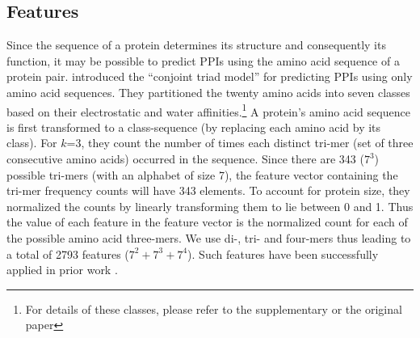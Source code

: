 \documentclass{bioinfo}
\begin{document}
\subsection{Features}
Since the sequence of a protein determines its structure and consequently its function, it may be possible to predict PPIs using the amino acid sequence of a protein pair. \cite{shen:2007} introduced the ``conjoint triad model'' for predicting PPIs using only amino acid sequences. They partitioned the twenty amino acids into seven classes based on their electrostatic and water affinities.\footnote{For details of these classes, please refer to the supplementary or the original paper}
A protein's amino acid sequence is first transformed to a class-sequence (by replacing each amino acid by its class).
For $k$=3, they count the number of times each distinct tri-mer (set of three consecutive amino acids) occurred in the sequence.
Since there are 343 ($7^3$) possible tri-mers (with an alphabet of size 7), the feature vector containing the tri-mer frequency counts will have 343 elements.
To account for protein size, they normalized the counts by linearly transforming them to lie between 0 and 1.
Thus the value of each feature in the feature vector is the normalized count for each of the possible amino acid three-mers. We use di-, tri- and four-mers thus leading to a total of 2793 features ($7^2 + 7^3 + 7^4$).
Such features have been successfully applied in prior work \citep{dyer07,me_ismb_2013}.
\end{document}
